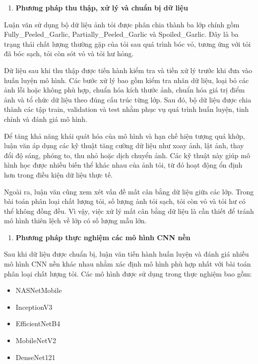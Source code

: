 \documentclass[
]{article}
\begin{document}
\begin{enumerate}
\def\labelenumi{\alph{enumi}.}
\setcounter{enumi}{1}
\item
  \textbf{Phương pháp thu thập, xử lý và chuẩn bị dữ liệu}
\end{enumerate}

Luận văn sử dụng bộ dữ liệu ảnh tỏi được phân chia thành ba lớp chính
gồm Fully\_Peeled\_Garlic, Partially\_Peeled\_Garlic và Spoiled\_Garlic.
Đây là ba trạng thái chất lượng thường gặp của tỏi sau quá trình bóc vỏ,
tương ứng với tỏi đã bóc sạch, tỏi còn sót vỏ và tỏi hư hỏng.

Dữ liệu sau khi thu thập được tiến hành kiểm tra và tiền xử lý trước khi
đưa vào huấn luyện mô hình. Các bước xử lý bao gồm kiểm tra nhãn dữ
liệu, loại bỏ các ảnh lỗi hoặc không phù hợp, chuẩn hóa kích thước ảnh,
chuẩn hóa giá trị điểm ảnh và tổ chức dữ liệu theo đúng cấu trúc từng
lớp. Sau đó, bộ dữ liệu được chia thành các tập train, validation và
test nhằm phục vụ quá trình huấn luyện, tinh chỉnh và đánh giá mô hình.

Để tăng khả năng khái quát hóa của mô hình và hạn chế hiện tượng quá
khớp, luận văn áp dụng các kỹ thuật tăng cường dữ liệu như xoay ảnh, lật
ảnh, thay đổi độ sáng, phóng to, thu nhỏ hoặc dịch chuyển ảnh. Các kỹ
thuật này giúp mô hình học được nhiều biến thể khác nhau của ảnh tỏi, từ
đó hoạt động ổn định hơn trong điều kiện dữ liệu thực tế.

Ngoài ra, luận văn cũng xem xét vấn đề mất cân bằng dữ liệu giữa các
lớp. Trong bài toán phân loại chất lượng tỏi, số lượng ảnh tỏi sạch, tỏi
còn vỏ và tỏi hư có thể không đồng đều. Vì vậy, việc xử lý mất cân bằng
dữ liệu là cần thiết để tránh mô hình thiên lệch về lớp có số lượng mẫu
lớn.

\begin{enumerate}
\def\labelenumi{\alph{enumi}.}
\setcounter{enumi}{2}
\item
  \textbf{Phương pháp thực nghiệm các mô hình CNN nền}
\end{enumerate}

Sau khi dữ liệu được chuẩn bị, luận văn tiến hành huấn luyện và đánh giá
nhiều mô hình CNN nền khác nhau nhằm xác định mô hình phù hợp nhất với
bài toán phân loại chất lượng tỏi. Các mô hình được sử dụng trong thực
nghiệm bao gồm:

\begin{itemize}
\item
  NASNetMobile
\item
  InceptionV3
\item
  EfficientNetB4
\item
  MobileNetV2
\item
  DenseNet121
\end{itemize}
\end{document}
